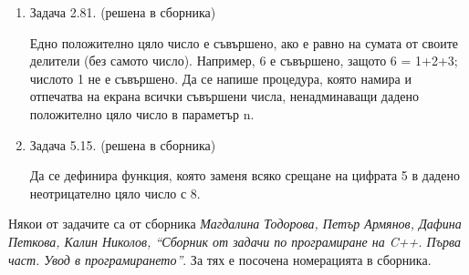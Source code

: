 \documentclass[12pt,a4paper]{article}
\begin{document}
\begin{enumerate}
\item Задача 2.81. (решена в сборника)

Едно положително цяло число е съвършено, ако е равно на сумата от своите делители (без самото число). Например, 6 е съвършено, защото 6 = 1+2+3; числото 1 не е съвършено. Да се напише процедура, която намира и отпечатва на екрана  всички съвършени числа, ненадминаващи дадено положително цяло число в параметър n.

\item Задача 5.15. (решена в сборника)

Да се дефинира функция, която заменя всяко срещане на цифрата 5 в дадено неотрицателно цяло число с 8.




\end{enumerate}


	\vspace{20px}

	\small{Някои от задачите са от сборника \textit{Магдалина Тодорова, Петър Армянов, Дафина Петкова, Калин Николов, ``Сборник от задачи по програмиране на C++. Първа част. Увод в програмирането''}. За тях е посочена номерацията в сборника.}
\end{document}
